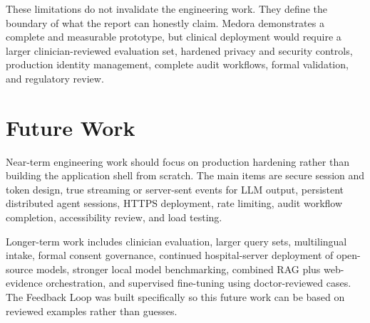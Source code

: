 These limitations do not invalidate the engineering work. They define the boundary of what the report can honestly claim. Medora demonstrates a complete and measurable prototype, but clinical deployment would require a larger clinician-reviewed evaluation set, hardened privacy and security controls, production identity management, complete audit workflows, formal validation, and regulatory review.

\section{Future Work}

Near-term engineering work should focus on production hardening rather than building the application shell from scratch. The main items are secure session and token design, true streaming or server-sent events for LLM output, persistent distributed agent sessions, HTTPS deployment, rate limiting, audit workflow completion, accessibility review, and load testing.

Longer-term work includes clinician evaluation, larger query sets, multilingual intake, formal consent governance, continued hospital-server deployment of open-source models, stronger local model benchmarking, combined RAG plus web-evidence orchestration, and supervised fine-tuning using doctor-reviewed cases. The Feedback Loop was built specifically so this future work can be based on reviewed examples rather than guesses.
